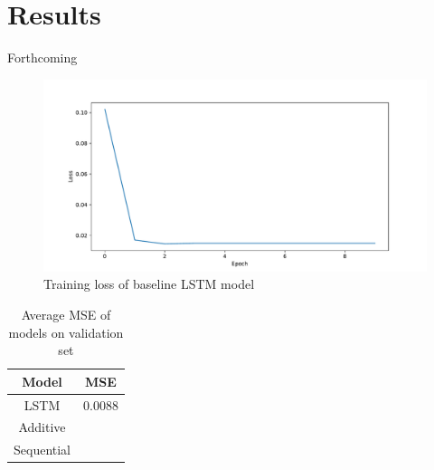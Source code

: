 \section{Results}

Forthcoming

\begin{figure}[H]
	\centering
	\includegraphics[width=\linewidth]{../../figures/vanilla_lstm_training_loss.pdf}
	\caption{Training loss of baseline LSTM model}
	\label{fig:lstm_loss}
\end{figure}

\begin{table}[H]
	\centering
	\begin{tabular}{|c|c|}
	\hline
	Model & MSE \\
	\hline
	LSTM & 0.0088 \\
	Additive & \\
	Sequential & \\
	\hline
	\end{tabular}
	\caption{Average MSE of models on validation set}
	\label{tab:results_summary}
\end{table}